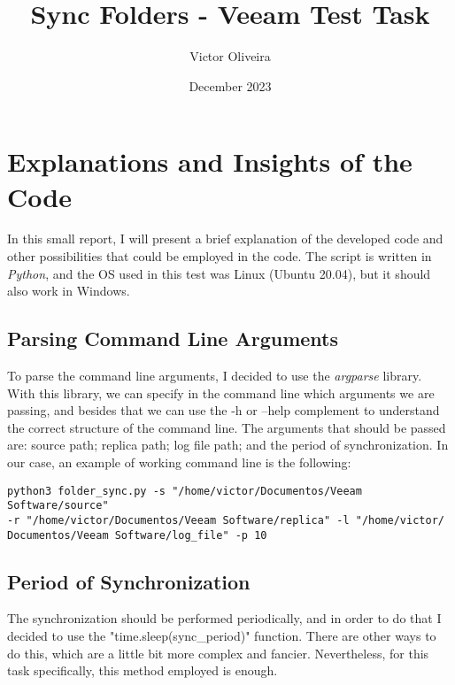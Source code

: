 \documentclass{article}
\title{\textbf{Sync Folders - Veeam Test Task}}
\author{Victor Oliveira}
\date{December 2023}
\begin{document}
\maketitle

\section{Explanations and Insights of the Code}

In this small report, I will present a brief explanation of the developed code and other possibilities that could be employed in the code. 
The script is written in \textit{Python}, and the OS used in this test was Linux (Ubuntu 20.04), but it should also work in Windows. 

\subsection{Parsing Command Line Arguments}

% 

To parse the command line arguments, I decided to use the \textit{argparse} library. With this library, we can specify in the command line which arguments we are passing, and besides that we can use the -h or --help complement to understand the correct structure of the command line. The arguments that should be passed are: source path; replica path; log file path; and the period of synchronization.
In our case, an example of working command line is the following:

\begin{lstlisting}
python3 folder_sync.py -s "/home/victor/Documentos/Veeam Software/source"
-r "/home/victor/Documentos/Veeam Software/replica" -l "/home/victor/
Documentos/Veeam Software/log_file" -p 10

\end{lstlisting}


\subsection{Period of Synchronization}

The synchronization should be performed periodically, and in order to do that I decided to use the "time.sleep(sync\_period)" function. There are other ways to do this, which are a little bit more complex and fancier. Nevertheless, for this task specifically, this method employed is enough.
\end{document}
